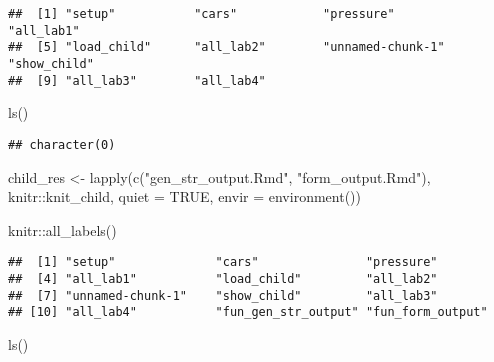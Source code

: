 \documentclass[
]{ctexart}
\newenvironment{Shaded}{\begin{snugshade}}{\end{snugshade}}
\newcommand{\AttributeTok}[1]{\textcolor[rgb]{0.77,0.63,0.00}{#1}}
\newcommand{\ConstantTok}[1]{\textcolor[rgb]{0.00,0.00,0.00}{#1}}
\newcommand{\FunctionTok}[1]{\textcolor[rgb]{0.00,0.00,0.00}{#1}}
\newcommand{\NormalTok}[1]{#1}
\newcommand{\OtherTok}[1]{\textcolor[rgb]{0.56,0.35,0.01}{#1}}
\newcommand{\SpecialCharTok}[1]{\textcolor[rgb]{0.00,0.00,0.00}{#1}}
\newcommand{\StringTok}[1]{\textcolor[rgb]{0.31,0.60,0.02}{#1}}
\begin{document}
\begin{verbatim}
##  [1] "setup"           "cars"            "pressure"        "all_lab1"       
##  [5] "load_child"      "all_lab2"        "unnamed-chunk-1" "show_child"     
##  [9] "all_lab3"        "all_lab4"
\end{verbatim}

\begin{Shaded}
\begin{Highlighting}[]
\FunctionTok{ls}\NormalTok{()}
\end{Highlighting}
\end{Shaded}

\begin{verbatim}
## character(0)
\end{verbatim}

\begin{Shaded}
\begin{Highlighting}[]
\NormalTok{child\_res }\OtherTok{\textless{}{-}} \FunctionTok{lapply}\NormalTok{(}\FunctionTok{c}\NormalTok{(}\StringTok{"gen\_str\_output.Rmd"}\NormalTok{, }\StringTok{"form\_output.Rmd"}\NormalTok{),}
\NormalTok{                    knitr}\SpecialCharTok{::}\NormalTok{knit\_child, }
                    \AttributeTok{quiet =} \ConstantTok{TRUE}\NormalTok{, }
                    \AttributeTok{envir =} \FunctionTok{environment}\NormalTok{())}
\end{Highlighting}
\end{Shaded}

\begin{Shaded}
\begin{Highlighting}[]
\NormalTok{knitr}\SpecialCharTok{::}\FunctionTok{all\_labels}\NormalTok{()}
\end{Highlighting}
\end{Shaded}

\begin{verbatim}
##  [1] "setup"              "cars"               "pressure"          
##  [4] "all_lab1"           "load_child"         "all_lab2"          
##  [7] "unnamed-chunk-1"    "show_child"         "all_lab3"          
## [10] "all_lab4"           "fun_gen_str_output" "fun_form_output"
\end{verbatim}

\begin{Shaded}
\begin{Highlighting}[]
\FunctionTok{ls}\NormalTok{()}
\end{Highlighting}
\end{Shaded}
\end{document}
